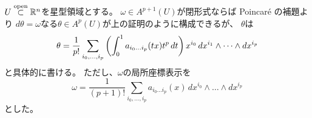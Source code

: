 \documentclass[report]{jlreq}
\begin{document}
\begin{corollary}
    $U \stackrel{\text{open}}{\subset} \mathbb{R}^n$を星型領域とする。
    $\omega \in A^{p + 1}(U)$が閉形式ならば
    Poincar\'{e} の補題より
    $d\theta = \omega$なる$\theta \in A^p(U)$が上の証明のように構成できるが、
    $\theta$は
    \begin{equation}
        \theta =
            \frac{1}{p!} \sum_{i_0, \dots, i_p}
            \left({
                \int_0^1 a_{i_0 \dots i_p}(tx)
                t^p \, dt
            }\right)
            x^{i_0}
            \, dx^{i_1} \wedge \dots \wedge dx^{i_p}
    \end{equation}
    と具体的に書ける。
    ただし、$\omega$の局所座標表示を
    \begin{equation}
        \omega = \frac{1}{(p + 1)!}
            \sum_{i_0, \dots, i_p} a_{i_0 \dots i_p}(x)
            \, dx^{i_0} \wedge \dots \wedge dx^{i_p}
    \end{equation}
    とした。
\end{corollary}
\end{document}

